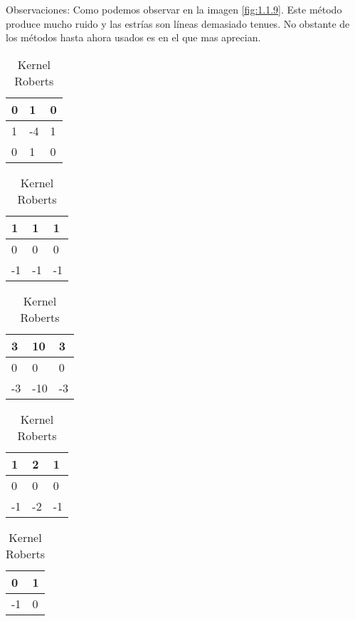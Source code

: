 Observaciones:
Como podemos observar en la imagen \ref{fig:1.1.9}.
Este método produce mucho ruido y las estrías son líneas demasiado tenues.
No obstante de los métodos hasta ahora usados es en el que mas aprecian.


\begin{table}[]

	\begin{minipage}{.5\linewidth}
		\centering
		\caption{Kernel Laplace}
		\label{F_k1}
		\begin{tabular}{|l|l|l|}
			\hline
			0 & 1  & 0 \\ \hline
			1 & -4 & 1 \\ \hline
			0 & 1  & 0 \\ \hline
		\end{tabular}
    \end{minipage}%
	\begin{minipage}{.5\linewidth}
		\centering
		\caption{Kernel Prewitt}
		\label{F_k2}
		\begin{tabular}{|l|l|l|}
			\hline
			1  & 1   & 1 \\ \hline
			0  & 0   & 0 \\ \hline
			-1 & -1  & -1 \\ \hline
		\end{tabular}
    \end{minipage}%

	\begin{minipage}{.5\linewidth}
		\centering
		\caption{Kernel HScharr}
		\label{F_k3}
		\begin{tabular}{|l|l|l|}
			\hline
			3  & 10  & 3 \\ \hline
			0  & 0   & 0 \\ \hline
			-3 & -10 & -3 \\ \hline
		\end{tabular}
    \end{minipage}%
	\begin{minipage}{.5\linewidth}
		\centering
		\caption{Kernel HSobel}
		\label{F_k4}
		\begin{tabular}{|l|l|l|}
			\hline
			1  & 2  & 1 \\ \hline
			0  & 0  & 0 \\ \hline
			-1 & -2 & -1 \\ \hline
		\end{tabular}
    \end{minipage}%
    
	\begin{minipage}{.5\linewidth}
		\centering
		\caption{Kernel Roberts}
		\label{F_k5}
		\begin{tabular}{|l|l|}
			\hline
			0  & 1 \\ \hline
			-1 & 0 \\ \hline
		\end{tabular}
    \end{minipage}%

\end{table}


